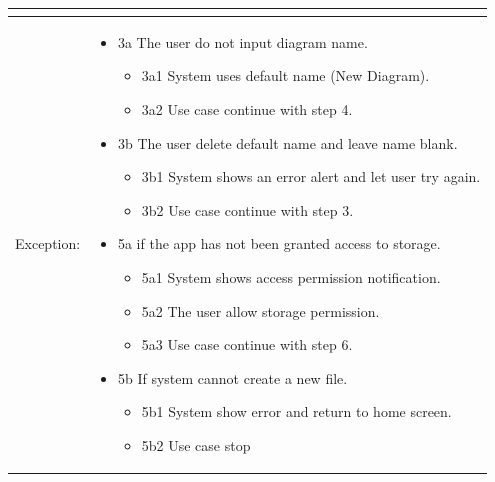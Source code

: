 \begin{table}[]
\begin{tabular}{| m{4cm} | m{11cm} |}
\begin{itemize}
\begin{itemize}
    \end{itemize}
\end{itemize} \\ \hline
Exception: & \begin{itemize}
    \item {3a The user do not input diagram name.}
    \begin{itemize}
        \item 3a1 System uses default name (New Diagram).
        \item 3a2 Use case continue with step 4.
    \end{itemize}
    \item {3b The user delete default name and leave name blank.}
    \begin{itemize}
        \item 3b1 System shows an error alert and let user try again.
        \item 3b2 Use case continue with step 3.
    \end{itemize}
    \item {5a if the app has not been granted access to storage.}
    \begin{itemize}
        \item 5a1 System shows access permission notification.
        \item 5a2 The user allow storage permission.
        \item 5a3 Use case continue with step 6.
    \end{itemize}
    \item {5b If system cannot create a new file.}
    \begin{itemize}
        \item 5b1 System show error and return to home screen.
        \item 5b2 Use case stop
    \end{itemize}
\end{itemize} \\ \hline
\end{tabular}
\end{table}

